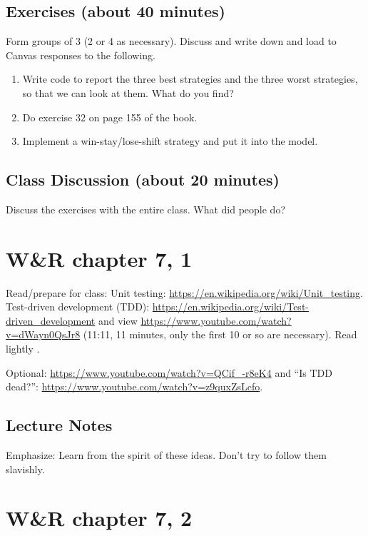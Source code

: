 \section{Exercises (about 40 minutes)}

Form groups of 3 (2 or 4 as necessary). Discuss and write down and load to Canvas responses to the following.

\begin{enumerate}
\item Write code to report the three best strategies and the three worst strategies, so that we can look at them. What do you find?
\item Do exercise 32 on page 155 of the book.

\item Implement a win-stay/lose-shift strategy and put it into the model.
\end{enumerate}

\section{Class Discussion (about 20 minutes)}

Discuss the exercises with the entire class. What did people do?


\chapter{W\&R chapter 7, 1}

Read/prepare for class: Unit testing: 
\url{https://en.wikipedia.org/wiki/Unit_testing}. Test-driven development (TDD):
\url{https://en.wikipedia.org/wiki/Test-driven_development} and view  \url{https://www.youtube.com/watch?v=dWayn0QsJr8} (11:11, 11 minutes, only the first 10 or so are necessary). Read lightly \citep[pages ]{wilensky_rand_2015}.


Optional: 
\url{https://www.youtube.com/watch?v=QCif_-r8eK4}
and 
``Is TDD dead?'':
\url{https://www.youtube.com/watch?v=z9quxZsLcfo}.


\section{Lecture Notes}

Emphasize: Learn from the spirit of these ideas. Don't try to follow them slavishly.





\chapter{W\&R chapter 7, 2}

